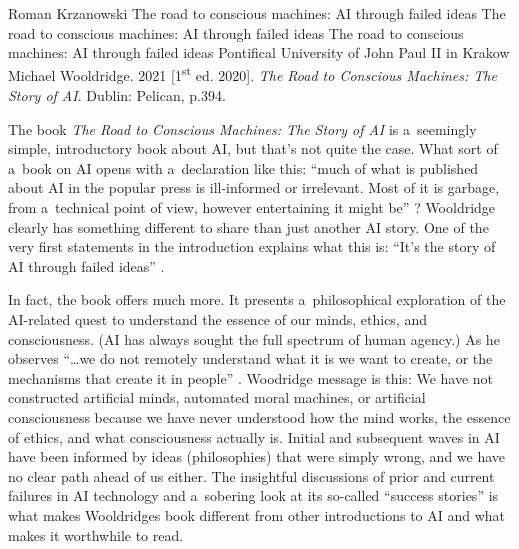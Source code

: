 \begin{newrevengenv}{Roman Krzanowski}
	{The road to conscious machines: AI through failed ideas}
	{The road to conscious machines: AI through failed ideas}
	{The road to conscious machines: AI through failed ideas}
	{Pontifical University of John Paul II in Krakow}
	{Michael Wooldridge. 2021 [1\textsuperscript{st} ed. 2020]. \textit{The Road to Conscious Machines: The Story of AI}. Dublin: Pelican, p.394.}


\lettrine[loversize=0.13,lines=2,lraise=-0.03,nindent=0em,findent=0.2pt]%
{T}{}he book \textit{The Road to Conscious Machines: The Story of AI} is a~seemingly simple, introductory book about AI, but that’s not quite the case. What sort of a~book on AI opens with a~declaration like this: ``much of what is published about AI in the popular press is ill-informed or irrelevant. Most of it is garbage, from a~technical point of view, however entertaining it might be''
\parencite[][p.3]{wooldridge_road_2021}?
Wooldridge clearly has something different to share than just another AI story. One of the very first statements in the introduction explains what this is: ``It’s the story of AI through failed ideas''
\parencite[][p.1]{wooldridge_road_2021}.

In fact, the book offers much more. It presents a~philosophical exploration of the AI-related quest to understand the essence of our minds, ethics, and consciousness. (AI has always sought the full spectrum of human agency.) As he observes ``…we do not remotely understand what it is we want to create, or the mechanisms that create it in people''
\parencite[][p.2]{wooldridge_road_2021}.
Woodridge message is this: We have not constructed artificial minds, automated moral machines, or artificial consciousness because we have never understood how the mind works, the essence of ethics, and what consciousness actually is. Initial and subsequent waves in AI have been informed by ideas (philosophies) that were simply wrong, and we have no clear path ahead of us either. The insightful discussions of prior and current failures in AI technology and a~sobering look at its so-called ``success stories'' is what makes Wooldridge{\textasciigrave}s book different from other introductions to AI and what makes it worthwhile to read.


\end{newrevengenv}
